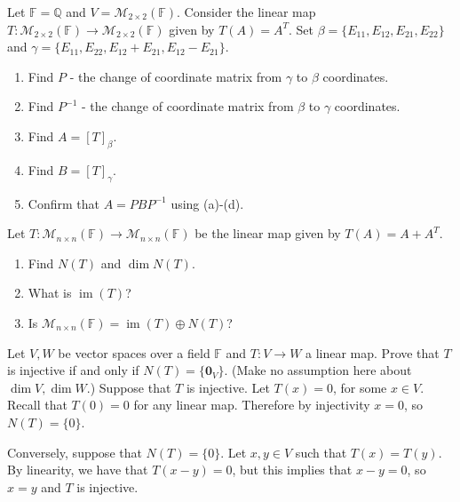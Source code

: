 \documentclass{eh-homework}
\begin{document}
    \begin{question}{4}
        Let \( \mathbb{F} = \mathbb{Q} \) and \( V = \mathcal{M}_{2 \times 2}(\mathbb{F}) \). Consider the linear map \( T : \mathcal{M}_{2 \times 2}(\mathbb{F}) \to \mathcal{M}_{2 \times 2}(\mathbb{F}) \) given by \( T(A) = A^T \). Set \( \beta = \{ E_{11}, E_{12}, E_{21}, E_{22} \} \) and \( \gamma = \{ E_{11}, E_{22}, E_{12} + E_{21}, E_{12} - E_{21} \} \).

        \begin{enumerate}
            \item Find \( P \) - the change of coordinate matrix from \( \gamma \) to \( \beta \) coordinates.
            \item Find \( P^{-1} \) - the change of coordinate matrix from \( \beta \) to \( \gamma \) coordinates.
            \item Find \( A = [T]_\beta \).
            \item Find \( B = [T]_\gamma \).
            \item Confirm that \( A = PBP^{-1} \) using (a)-(d).
        \end{enumerate}
    \end{question}

    \begin{question}{5}
        Let \( T : \mathcal{M}_{n \times n}(\mathbb{F}) \to \mathcal{M}_{n \times n}(\mathbb{F}) \) be the linear map given by \( T(A) = A + A^T \).

        \begin{enumerate}
            \item Find \( N(T) \) and \( \dim N(T) \).
            \item What is \( \operatorname{im}(T) \)?
            \item Is \( \mathcal{M}_{n \times n}(\mathbb{F}) = \operatorname{im}(T) \oplus N(T) \)?
        \end{enumerate}
    \end{question}

    \begin{question}{6}
        Let \( V, W \) be vector spaces over a field \( \mathbb{F} \) and \( T : V \to W \) a linear map. Prove that \( T \) is injective if and only if \( N(T) = \{\mathbf{0}_V\} \). (Make no assumption here about \( \dim V, \dim W \).)
        \tcblower
        Suppose that \(T\) is injective. Let \(T(x) = 0\), for some \(x \in V\). Recall that \(T(0) = 0\) for any linear map. Therefore by injectivity \(x = 0\), so \(N(T) = \{ 0 \}\).

        Conversely, suppose that \(N(T) = \{ 0 \}\). Let \(x,y \in V\) such that \(T(x) = T(y)\). By linearity, we have that \(T(x - y) = 0\), but this implies that \(x - y = 0\), so \(x = y\) and \(T\) is injective.
    \end{question}
\end{document}
